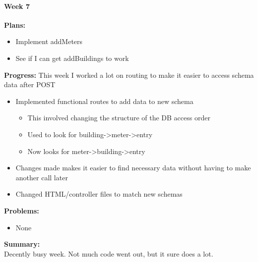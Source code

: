 \paragraph{Week 7}
\begin{adjustwidth}{2.5em}{0pt}
    \vspace{-0.5cm}\textbf{Plans:}
    \vspace{-0.5cm}
    \begin{itemize}
        \item Implement addMeters 
		\item See if I can get addBuildings to work 
    \end{itemize} 
    \vspace{-0.3cm}\textbf{Progress:}
	\noident This week I worked a lot on routing to make it easier to access schema data after POST 
    \vspace{-0.5cm}
    \begin{itemize}
        \item Implemented functional routes to add data to new schema
		\begin{itemize}
			\item This involved changing the structure of the DB access order
			\item Used to look for building->meter->entry 
			\item Now looks for meter->building->entry 
		\end{itemize}
		\item Changes made makes it easier to find necessary data without having to make another call later 
		\item Changed HTML/controller files to match new schemas 
    \end{itemize} 
    \vspace{-0.3cm}\textbf{Problems:}
    \vspace{-0.5cm}
    \begin{itemize}
        \item None
    \end{itemize}  
    \vspace{-0.3cm}\noindent\textbf{Summary:}\\
    \noindent Decently busy week. Not much code went out, but it sure does a lot.
	\end{adjustwidth} 

